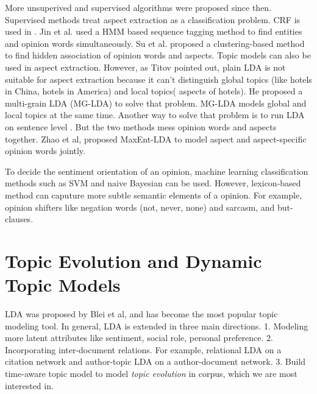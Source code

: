 \documentclass{article}
\begin{document}
More unsuperived and supervised algorithms were proposed since then. Supervised methods treat aspect extraction as a classification problem. CRF is used in \cite{jakob2010extracting}. Jin et al. \cite{jin2009opinionminer} used a HMM based sequence tagging method to find entities and opinion words simultaneously. Su et al. \cite{su2008hidden} proposed a clustering-based method to find hidden association of opinion words and aspects. Topic models can also be used in aspect extraction. However, as Titov\cite{titov2008modeling} pointed out, plain LDA is not suitable for aspect extraction because it can't distinguish global topics (like hotels in China, hotels in America) and local topics( aspects of hotels). He proposed a multi-grain LDA (MG-LDA) to solve that problem. MG-LDA models global and local topics at the same time. Another way to solve that problem is to run LDA on sentence level \cite{brody2010unsupervised}. But the two methods mess opinion words and aspects together. Zhao et al, \cite{zhao2010jointly} proposed MaxEnt-LDA to model aspect and aspect-specific opinion words jointly.

To decide the sentiment orientation of an opinion, machine learning classification methods such as SVM and naive Bayesian can be used. However, lexicon-based method can caputure more subtle semantic elements of a opinion\cite{ding2008holistic}. For example, opinion shifters like negation words (not, never, none) and sarcasm, and but-clauses. 

\section {Topic Evolution and Dynamic Topic Models}
LDA was proposed by Blei et al,\cite{blei2003latent} and has become the most popular topic modeling tool. In general, LDA is extended in three main directions. 1. Modeling more latent attributes like sentiment, social role, personal preference. 2. Incorporating inter-document relations. For example, relational LDA\cite{chang2009relational} on a citation network and author-topic LDA\cite{rosen2004author} on a author-document network. 3. Build time-aware topic model to model {\em topic evolution} in corpus, which we are most interested in.
\end{document}

